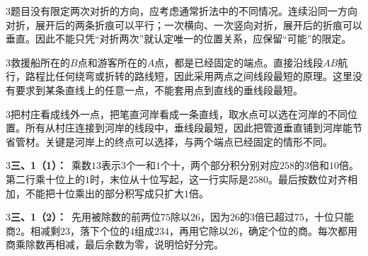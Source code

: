 \documentclass[multi=snippet,border={5bp 20bp 5bp 5bp}]{standalone}
\newenvironment{snippet}[3]{\begin{minipage}{#1bp}\color{answerred}\fontsize{#2}{#3}\selectfont\raggedright}{\end{minipage}}
\begin{document}
\begin{snippet}{505}{11.5}{14}\begin{multicols}{3}\raggedcolumns 题目没有限定两次对折的方向，应考虑通常折法中的不同情况。连续沿同一方向对折，展开后的两条折痕可以平行；一次横向、一次竖向对折，展开后的折痕可以垂直。因此不能只凭“对折两次”就认定唯一的位置关系，应保留“可能”的限定。\end{multicols}\end{snippet}
\begin{snippet}{505}{11.5}{14}\begin{multicols}{3}\raggedcolumns 救援船所在的\(B\)\allowbreak 点和游客所在的\(A\)\allowbreak 点，都是已经固定的端点。直接沿线段\(AB\)\allowbreak 航行，路程比任何绕弯或折转的路线短，因此采用两点之间线段最短的原理。这里没有要求到某条直线上的任意一点，不能套用点到直线的垂线段最短。\end{multicols}\end{snippet}
\begin{snippet}{505}{11.5}{14}\begin{multicols}{3}\raggedcolumns 把村庄看成线外一点，把笔直河岸看成一条直线，取水点可以选在河岸的不同位置。所有从村庄连接到河岸的线段中，垂线段最短，因此把管道垂直铺到河岸能节省管材。关键是河岸上的终点可以选择，与两个端点已经固定的情形不同。\end{multicols}\end{snippet}
\begin{snippet}{505}{11.5}{14}\begin{multicols}{3}\raggedcolumns \textbf{三、1（1）：}\ 乘数\(13\)\allowbreak 表示\(3\)\allowbreak 个一和\(1\)\allowbreak 个十，两个部分积分别对应\(258\)\allowbreak 的\(3\)\allowbreak 倍和\(10\)\allowbreak 倍。第二行乘十位上的\(1\)\allowbreak 时，末位从十位写起，这一行实际是\(2580\)\allowbreak 。最后按数位对齐相加，不能把十位乘出的部分积写成只扩大\(1\)\allowbreak 倍。\end{multicols}\end{snippet}
\begin{snippet}{505}{11.5}{14}\begin{multicols}{3}\raggedcolumns \textbf{三、1（2）：}\ 先用被除数的前两位\(75\)\allowbreak 除以\(26\)\allowbreak ，因为\(26\)\allowbreak 的\(3\)\allowbreak 倍已超过\(75\)\allowbreak ，十位只能商\(2\)\allowbreak 。相减剩\(23\)\allowbreak ，落下个位的\(4\)\allowbreak 组成\(234\)\allowbreak ，再用它除以\(26\)\allowbreak ，确定个位的商。每次都用商乘除数再相减，最后余数为零，说明恰好分完。\end{multicols}\end{snippet}
\end{document}
